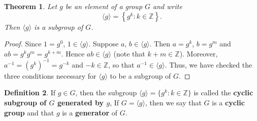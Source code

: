 \documentclass[11pt]{article}
\newcommand{\Z} {{\mathbb Z}}
\newcommand{\set}[1]{\left\{#1\right\}}
\theoremstyle{plain}
\newtheorem{thm}{Theorem}%
\theoremstyle{definition}
\newtheorem{defn}[thm]{Definition}
\begin{document}
\begin{thm}
  Let $g$ be an element of a group $G$ and write
$$\langle g\rangle = \set{g^k: k\in \Z}.$$
Then $\langle g\rangle$ is a subgroup of $G$.
\end{thm}
\begin{proof}  Since $1=g^0$, $1\in \langle g\rangle$.  Suppose $a$,
$b\in \langle g\rangle$.  Then $a=g^k$, $b=g^m$ and
$ab=g^kg^m=g^{k+m}$. Hence $ab\in \langle g\rangle$ (note that
$k+m\in \Z$).  Moreover, $a^{-1} = (g^k)^{-1} = g^{-k}$ and $-k\in
\Z$, so that $a^{-1}\in \langle g\rangle$.  Thus, we have checked
the three conditions necessary for $\langle g\rangle$ to be a
subgroup of $G$.
\end{proof}
\begin{defn}  If $g\in G$, then the subgroup $\langle g\rangle = \{g^k:
k\in \Z\}$ is called the {\bf cyclic subgroup of $G$ generated by
$g$}, If $G=\langle g\rangle$, then we say that $G$ is a {\bf
cyclic group} and that $g$ is a {\bf generator} of $G$.
\end{defn}
\end{document}

